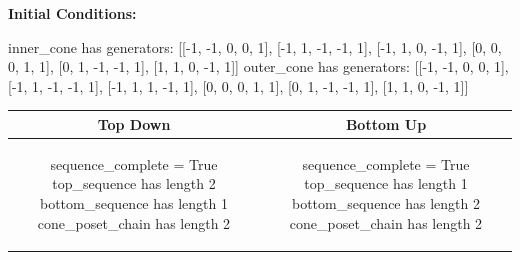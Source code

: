 \documentclass[10pt]{article}
\begin{document}
\textbf{Initial Conditions:}
\begin{SAGE}
inner_cone has generators: 
[[-1, -1, 0, 0, 1], [-1, 1, -1, -1, 1], [-1, 1, 0, -1, 1], [0, 0, 0, 1, 1], [0, 1, -1, -1, 1], [1, 1, 0, -1, 1]]
outer_cone has generators: 
[[-1, -1, 0, 0, 1], [-1, 1, -1, -1, 1], [-1, 1, 1, -1, 1], [0, 0, 0, 1, 1], [0, 1, -1, -1, 1], [1, 1, 0, -1, 1]]

\end{SAGE}
\begin{tabular}{c|c}
\textbf{Top Down} & \textbf{Bottom Up} \\ \hline  
\begin{SAGE}
sequence_complete = True
top_sequence has length 2
bottom_sequence has length 1
cone_poset_chain has length 2
\end{SAGE} 
&
\begin{SAGE}
sequence_complete = True
top_sequence has length 1
bottom_sequence has length 2
cone_poset_chain has length 2
\end{SAGE} 
\\ \hline


\end{tabular}
\end{document}
